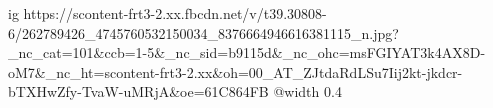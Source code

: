  
 
 
 
 

\ifcmt
  ig https://scontent-frt3-2.xx.fbcdn.net/v/t39.30808-6/262789426_4745760532150034_8376664946616381115_n.jpg?_nc_cat=101&ccb=1-5&_nc_sid=b9115d&_nc_ohc=msFGIYAT3k4AX8D-oM7&_nc_ht=scontent-frt3-2.xx&oh=00_AT_ZJtdaRdLSu7Iij2kt-jkdcr-bTXHwZfy-TvaW-uMRjA&oe=61C864FB
  @width 0.4
\fi

